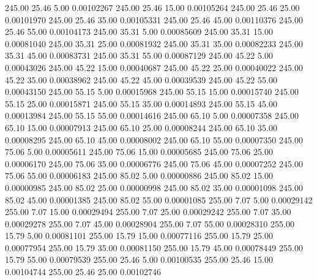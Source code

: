     245.00     25.46      5.00     0.00102267
    245.00     25.46     15.00     0.00105264
    245.00     25.46     25.00     0.00101970
    245.00     25.46     35.00     0.00105331
    245.00     25.46     45.00     0.00110376
    245.00     25.46     55.00     0.00104173
    245.00     35.31      5.00     0.00085609
    245.00     35.31     15.00     0.00081040
    245.00     35.31     25.00     0.00081932
    245.00     35.31     35.00     0.00082233
    245.00     35.31     45.00     0.00083731
    245.00     35.31     55.00     0.00087129
    245.00     45.22      5.00     0.00043026
    245.00     45.22     15.00     0.00040687
    245.00     45.22     25.00     0.00040022
    245.00     45.22     35.00     0.00038962
    245.00     45.22     45.00     0.00039539
    245.00     45.22     55.00     0.00043150
    245.00     55.15      5.00     0.00015968
    245.00     55.15     15.00     0.00015740
    245.00     55.15     25.00     0.00015871
    245.00     55.15     35.00     0.00014893
    245.00     55.15     45.00     0.00013984
    245.00     55.15     55.00     0.00014616
    245.00     65.10      5.00     0.00007358
    245.00     65.10     15.00     0.00007913
    245.00     65.10     25.00     0.00008244
    245.00     65.10     35.00     0.00008295
    245.00     65.10     45.00     0.00008002
    245.00     65.10     55.00     0.00007350
    245.00     75.06      5.00     0.00005611
    245.00     75.06     15.00     0.00005685
    245.00     75.06     25.00     0.00006170
    245.00     75.06     35.00     0.00006776
    245.00     75.06     45.00     0.00007252
    245.00     75.06     55.00     0.00006183
    245.00     85.02      5.00     0.00000886
    245.00     85.02     15.00     0.00000985
    245.00     85.02     25.00     0.00000998
    245.00     85.02     35.00     0.00001098
    245.00     85.02     45.00     0.00001385
    245.00     85.02     55.00     0.00001085
    255.00      7.07      5.00     0.00029142
    255.00      7.07     15.00     0.00029494
    255.00      7.07     25.00     0.00029242
    255.00      7.07     35.00     0.00029278
    255.00      7.07     45.00     0.00028904
    255.00      7.07     55.00     0.00028310
    255.00     15.79      5.00     0.00081101
    255.00     15.79     15.00     0.00077116
    255.00     15.79     25.00     0.00077954
    255.00     15.79     35.00     0.00081150
    255.00     15.79     45.00     0.00078449
    255.00     15.79     55.00     0.00079539
    255.00     25.46      5.00     0.00100535
    255.00     25.46     15.00     0.00104744
    255.00     25.46     25.00     0.00102746
